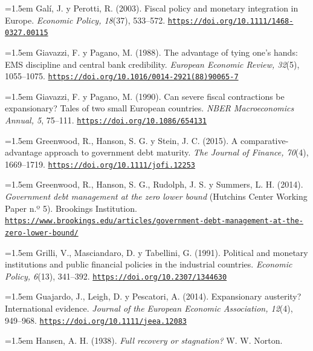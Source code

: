 \documentclass[10pt,a4paper]{article}
\begin{document}
\noindent\hangindent=1.5em Galí, J. y Perotti, R. (2003). Fiscal policy and monetary integration in Europe. \textit{Economic Policy, 18}(37), 533--572. \href{https://doi.org/10.1111/1468-0327.00115}{\nolinkurl{https://doi.org/10.1111/1468-0327.00115}}

\noindent\hangindent=1.5em Giavazzi, F. y Pagano, M. (1988). The advantage of tying one's hands: EMS discipline and central bank credibility. \textit{European Economic Review, 32}(5), 1055--1075. \href{https://doi.org/10.1016/0014-2921(88)90065-7}{\nolinkurl{https://doi.org/10.1016/0014-2921(88)90065-7}}

\noindent\hangindent=1.5em Giavazzi, F. y Pagano, M. (1990). Can severe fiscal contractions be expansionary? Tales of two small European countries. \textit{NBER Macroeconomics Annual, 5}, 75--111. \href{https://doi.org/10.1086/654131}{\nolinkurl{https://doi.org/10.1086/654131}}

\noindent\hangindent=1.5em Greenwood, R., Hanson, S. G. y Stein, J. C. (2015). A comparative-advantage approach to government debt maturity. \textit{The Journal of Finance, 70}(4), 1669--1719. \href{https://doi.org/10.1111/jofi.12253}{\nolinkurl{https://doi.org/10.1111/jofi.12253}}

\noindent\hangindent=1.5em Greenwood, R., Hanson, S. G., Rudolph, J. S. y Summers, L. H. (2014). \textit{Government debt management at the zero lower bound} (Hutchins Center Working Paper n.º 5). Brookings Institution. \href{https://www.brookings.edu/articles/government-debt-management-at-the-zero-lower-bound/}{\nolinkurl{https://www.brookings.edu/articles/government-debt-management-at-the-zero-lower-bound/}}

\noindent\hangindent=1.5em Grilli, V., Masciandaro, D. y Tabellini, G. (1991). Political and monetary institutions and public financial policies in the industrial countries. \textit{Economic Policy, 6}(13), 341--392. \href{https://doi.org/10.2307/1344630}{\nolinkurl{https://doi.org/10.2307/1344630}}

\noindent\hangindent=1.5em Guajardo, J., Leigh, D. y Pescatori, A. (2014). Expansionary austerity? International evidence. \textit{Journal of the European Economic Association, 12}(4), 949--968. \href{https://doi.org/10.1111/jeea.12083}{\nolinkurl{https://doi.org/10.1111/jeea.12083}}

\noindent\hangindent=1.5em Hansen, A. H. (1938). \textit{Full recovery or stagnation?} W. W. Norton.
\end{document}
